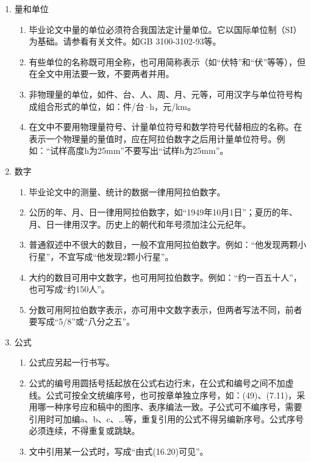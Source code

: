 \documentclass{HDU-Bachelor-Thesis}
\begin{document}
\begin{enumerate}
    \item 量和单位
    \begin{enumerate}
        \item 毕业论文中量的单位必须符合我国法定计量单位。它以国际单位制（SI）为基础。请参看有关文件。如GB 3100-3102-93等\cite{gb3100-1993}。
        \item 有些单位的名称既可用全称，也可用简称表示（如“伏特”和“伏”等等），但在全文中用法要一致，不要两者并用。
        \item 非物理量的单位，如件、台、人、周、月、元等，可用汉字与单位符号构成组合形式的单位，如：件/台$\!\cdot$h，元/km。
        \item 在文中不要用物理量符号、计量单位符号和数学符号代替相应的名称。在表示一个物理量的量值时，应在阿拉伯数字之后用计量单位符号。例如：“试样高度h为25mm”不要写出“试样h为25mm”。
    \end{enumerate}

    \item 数字
    \begin{enumerate}
        \item 毕业论文中的测量、统计的数据一律用阿拉伯数字。
        \item 公历的年、月、日一律用阿拉伯数字，如“1949年10月1日”；夏历的年、月、日一律用汉字。历史上的朝代和年号须加注公元纪年。
        \item 普通叙述中不很大的数目，一般不宜用阿拉伯数字。例如：“他发现两颗小行星”，不宜写成“他发现2颗小行星”。
        \item 大约的数目可用中文数字，也可用阿拉伯数字。例如：“约一百五十人”，也可写成“约150人”。
        \item 分数可用阿拉伯数字表示，亦可用中文数字表示，但两者写法不同，前者要写成“5/8”或“八分之五”。
    \end{enumerate}

    \item 公式
    \begin{enumerate}
        \item 公式应另起一行书写。
        \item 公式的编号用圆括号括起放在公式右边行末，在公式和编号之间不加虚线。公式可按全文统编序号，也可按章单独立序号，如：(49)、(7.11)，采用哪一种序号应和稿中的图序、表序编法一致。子公式可不编序号，需要引用时可加编a、b、c、…等，重复引用的公式不得另编新序号。公式序号必须连续，不得重复或跳缺。
        \item 文中引用某一公式时，写成“由式(16.20)可见”。
    \end{enumerate}


\end{enumerate}
\end{document}
